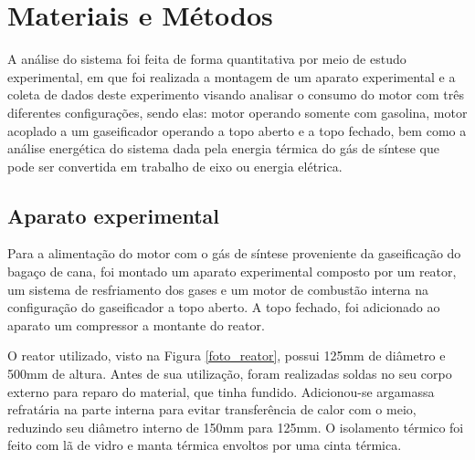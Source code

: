\chapter[Materiais e métodos]{Materiais e Métodos}

A análise do sistema foi feita de forma quantitativa por meio de estudo experimental, em que foi realizada a montagem de um aparato experimental e a coleta de dados deste experimento visando analisar o consumo do motor com três diferentes configurações, sendo elas: motor operando somente com gasolina, motor acoplado a um gaseificador operando a topo aberto e a topo fechado, bem como a análise energética do sistema dada pela energia térmica do gás de síntese que pode ser convertida em trabalho de eixo ou energia elétrica.

\section{Aparato experimental}
Para a alimentação do motor com o gás de síntese proveniente da gaseificação do bagaço de cana, foi montado um aparato experimental composto por um reator, um sistema de resfriamento dos gases e um motor de combustão interna na configuração do gaseificador a topo aberto. A topo fechado, foi adicionado ao aparato um compressor a montante do reator.

O reator utilizado, visto na Figura \ref{foto_reator}, possui 125mm de diâmetro e 500mm de altura. Antes de sua utilização, foram realizadas soldas no seu corpo externo para reparo do material, que tinha fundido. Adicionou-se argamassa refratária na parte interna para evitar transferência de calor com o meio, reduzindo seu diâmetro interno de 150mm para 125mm. O isolamento térmico foi feito com lã de vidro e manta térmica envoltos por uma cinta térmica.

